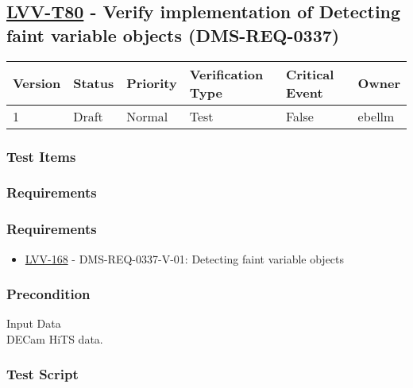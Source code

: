 \hypertarget{lvv-t80---verify-implementation-of-detecting-faint-variable-objects-dms-req-0337}{%
\subsection{\texorpdfstring{\href{https://jira.lsstcorp.org/secure/Tests.jspa\#/testCase/LVV-T80}{LVV-T80}
- Verify implementation of Detecting faint variable objects
(DMS-REQ-0337)}{LVV-T80 - Verify implementation of Detecting faint variable objects (DMS-REQ-0337)}}\label{lvv-t80---verify-implementation-of-detecting-faint-variable-objects-dms-req-0337}}

\begin{longtable}[]{@{}llllll@{}}
\toprule
Version & Status & Priority & Verification Type & Critical Event &
Owner\tabularnewline
\midrule
\endhead
1 & Draft & Normal & Test & False & ebellm\tabularnewline
\bottomrule
\end{longtable}

\hypertarget{test-items-12}{%
\subsubsection{Test Items}\label{test-items-12}}

\hypertarget{requirements-24}{%
\subsubsection{Requirements}\label{requirements-24}}

\hypertarget{requirements-25}{%
\subsubsection{Requirements}\label{requirements-25}}

\begin{itemize}
\tightlist
\item
  \href{https://jira.lsstcorp.org/browse/LVV-168}{LVV-168} -
  DMS-REQ-0337-V-01: Detecting faint variable objects
\end{itemize}

\hypertarget{precondition-4}{%
\subsubsection{Precondition}\label{precondition-4}}

Input Data\\
DECam HiTS data.

\hypertarget{test-script-12}{%
\subsubsection{Test Script}\label{test-script-12}}

